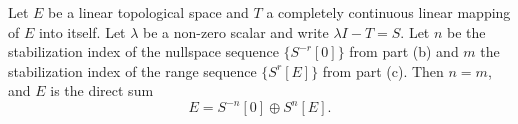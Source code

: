 Let $E$ be a linear topological space and $T$ a completely continuous linear mapping of $E$ into itself. Let $\lambda$ be a non-zero scalar and write $\lambda I - T = S$. Let $n$ be the stabilization index of the nullspace sequence $\{S^{-r}[0]\}$ from part (b) and $m$ the stabilization index of the range sequence $\{S^r[E]\}$ from part (c). Then $n = m$, and $E$ is the direct sum
$$E = S^{-n}[0] \oplus S^n[E].$$
